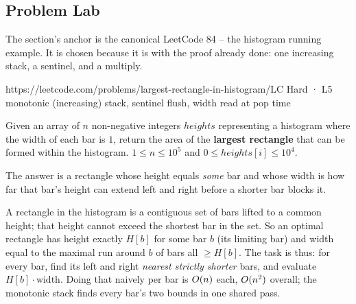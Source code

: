 \subsection{Problem Lab}

The section's anchor is the canonical LeetCode 84 -- the histogram running example. It is chosen because
it is  with the proof already done: one increasing stack, a sentinel, and a multiply.

  {https://leetcode.com/problems/largest-rectangle-in-histogram/}{LC Hard · L5}
  {monotonic (increasing) stack, sentinel flush, width read at pop time}

\begin{problemstatement}
Given an array of $n$ non-negative integers $\mathit{heights}$ representing a histogram where the width
of each bar is $1$, return the area of the \textbf{largest rectangle} that can be formed within the
histogram. $1 \le n \le 10^{5}$ and $0 \le \mathit{heights}[i] \le 10^{4}$.
\end{problemstatement}

\begin{attemptgate}
The answer is a rectangle whose height equals \emph{some} bar and whose width is how far that bar's
height can extend left and right before a shorter bar blocks it.
\end{attemptgate}

A rectangle in the histogram is a contiguous set of bars lifted to a common height; that height cannot
exceed the shortest bar in the set. So an optimal rectangle has height exactly $H[b]$ for some bar $b$
(its limiting bar) and width equal to the maximal run around $b$ of bars all $\ge H[b]$. The task is thus:
for every bar, find its left and right \emph{nearest strictly shorter} bars, and evaluate
$H[b]\cdot\text{width}$. Doing that naively per bar is $O(n)$ each, $O(n^2)$ overall; the
monotonic stack finds every bar's two bounds in one shared pass.

